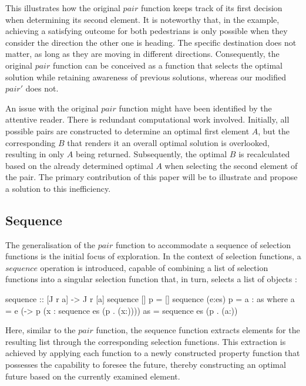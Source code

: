 \documentclass[runningheads]{llncs}
\begin{document}
This illustrates how the original \(pair\) function keeps track of its
first decision when determining its second element. It is noteworthy
that, in the example, achieving a satisfying outcome for both
pedestrians is only possible when they consider the direction the other
one is heading. The specific destination does not matter, as long as
they are moving in different directions. Consequently, the original
\(pair\) function can be conceived as a function that selects the
optimal solution while retaining awareness of previous solutions,
whereas our modified \(pair'\) does not.

\qquad An issue with the original \(pair\) function might have been
identified by the attentive reader. There is redundant computational
work involved. Initially, all possible pairs are constructed to
determine an optimal first element \(A\), but the corresponding \(B\)
that renders it an overall optimal solution is overlooked, resulting in
only \(A\) being returned. Subsequently, the optimal \(B\) is
recalculated based on the already determined optimal \(A\) when
selecting the second element of the pair. The primary contribution of
this paper will be to illustrate and propose a solution to this
inefficiency.

\subsection{Sequence}\label{sequence}

The generalisation of the \(pair\) function to accommodate a sequence of
selection functions is the initial focus of exploration. In the context
of selection functions, a \(sequence\) operation is introduced, capable
of combining a list of selection functions into a singular selection
function that, in turn, selects a list of objects
\cite{escardo2010sequential}:

\begin{code}
sequence :: [J r a] -> J r [a]
sequence [] p     = []
sequence (e:es) p = a : as
  where 
      a  = e (\x -> p (x : sequence es (p . (x:))))
      as = sequence es (p . (a:))
\end{code}

Here, similar to the \(pair\) function, the sequence function extracts
elements for the resulting list through the corresponding selection
functions. This extraction is achieved by applying each function to a
newly constructed property function that possesses the capability to
foresee the future, thereby constructing an optimal future based on the
currently examined element.
\end{document}
